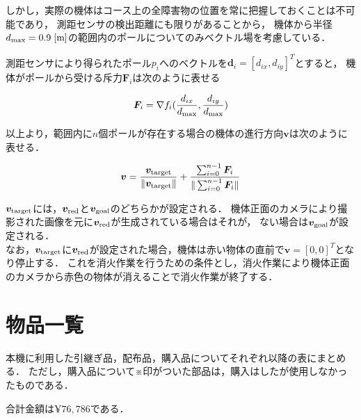 \documentclass[11pt,a4]{jsarticle}
\begin{document}
  しかし，実際の機体はコース上の全障害物の位置を常に把握しておくことは不可能であり，
  測距センサの検出距離にも限りがあることから，
  機体から半径$d_{\rm{max}} = 0.9 \hspace{1mm}\mathrm{[m]}$の範囲内のポールについてのみベクトル場を考慮している．

  測距センサにより得られたポール$p_i$へのベクトルを$\bm{d}_i = [d_{ix}, d_{iy}]^{T}$とすると，
  機体がポールから受ける斥力$\bm{F}_i$は次のように表せる

  \begin{equation}
    \bm{F}_i = \nabla f_i(\frac{d_{ix}}{d_{\rm{max}}}, \frac{d_{iy}}{d_{\rm{max}}})
  \end{equation}

  以上より，範囲内に$n$個ポールが存在する場合の機体の進行方向$\bm{v}$は次のように表せる．

  \begin{equation}
    \bm{v} = \frac{\bm{v}_{\rm{target}}}{\|\bm{v}_{\rm{target}}\|} + \frac{\sum_{i=0}^{n-1}{\bm{F}_i}}{\|\sum_{i=0}^{n-1}{\bm{F}_i}\|}
  \end{equation}

  $\bm{v}_{\rm{target}}$には，$\bm{v}_{\rm{red}}$と$\bm{v}_{\rm{goal}}$のどちらかが設定される．
  機体正面のカメラにより撮影された画像を元に$\bm{v}_{\rm{red}}$が生成されている場合はそれが，
  ない場合は$\bm{v}_{\rm{goal}}$が設定される．\\

  なお，$\bm{v}_{\rm{target}}$に$\bm{v}_{\rm{red}}$が設定された場合，機体は赤い物体の直前で$\bm{v} = [0, 0]^{T}$となり停止する．
  これを消火作業を行うための条件とし，消火作業により機体正面のカメラから赤色の物体が消えることで消火作業が終了する．

\section{物品一覧}
  本機に利用した引継ぎ品，配布品，購入品についてそれぞれ以降の表にまとめる．
  ただし，購入品について※印がついた部品は，購入はしたが使用しなかったものである．

  合計金額は$\yen 76,786$である．
\end{document}

